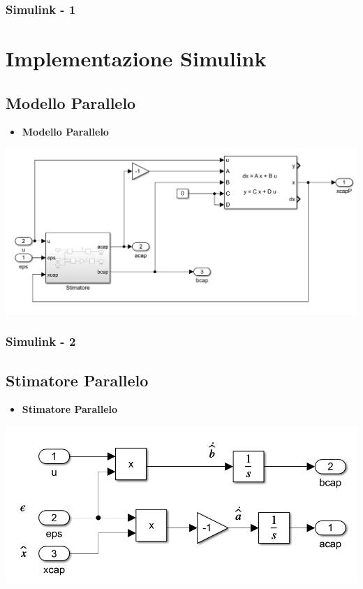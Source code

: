 \documentclass{beamer}
\begin{document}
\begin{frame}
    \frametitle{Simulink - 1}
    \section{Implementazione Simulink}
    \subsection{Modello Parallelo}
    \begin{itemize}
        \item \textbf{Modello Parallelo}
    \end{itemize}
\begin{center}
            \includegraphics[scale=0.3]{ModelloParallelo.jpg}%
        \end{center}
\end{frame}
\begin{frame}
    \frametitle{Simulink - 2}
    \subsection{Stimatore Parallelo}
    \begin{itemize}
        \item \textbf{Stimatore Parallelo}
    \end{itemize}
        \begin{center}
            \includegraphics[scale=0.3]{StimatoreParallelo.jpg}%
        \end{center}
\end{frame}
\end{document}
